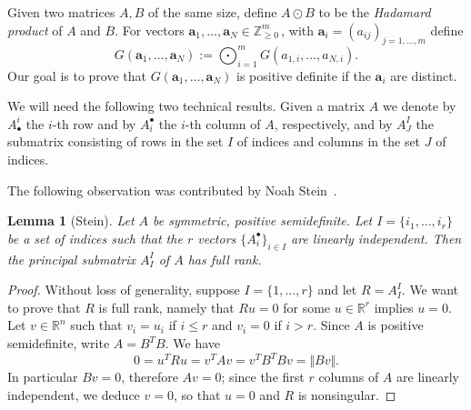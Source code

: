 \documentclass[11pt]{article}
\numberwithin{equation}{section}
\newtheorem{lemma}[theorem]{Lemma}
\theoremstyle{definition}
\theoremstyle{plain}
\newcommand{\vvirg}{ , \dots , }
\newcommand{\bfa}{\mathbf{a}}
\newcommand{\bbR}{\mathbb{R}}
\newcommand{\bbZ}{\mathbb{Z}}
\begin{document}
Given two matrices $A,B$ of the same size, define $A \odot B$ to be the \emph{Hadamard product} of $A$ and $B$. For vectors $\bfa_1 \vvirg \bfa_N \in \bbZ^{m}_{\geq 0}$\,, with $\bfa_i = (a_{ij}) _{j = 1 \vvirg m}$ define 
\[
 G(\bfa_1 \vvirg \bfa_N) := \bigodot_{i=1}^m G(a_{1,i}\vvirg a_{N,i}).
\]
Our goal is to prove that $G(\bfa_1 \vvirg \bfa_N)$ is positive definite if the  $\bfa_i$ are distinct.

%
We will need the following two technical results.  Given a matrix $A$ we
%
denote by $A^i_\bullet$ the $i$-th row   %
and by $A^\bullet_i$ the $i$-th column of $A$, respectively,  %
%
and by $A^I_J$ the submatrix consisting of rows in the set
%
%
$I$ of indices and columns in the set $J$ of indices.   %

%
The following observation was contributed by Noah Stein~\cite{266847}.
\begin{lemma}[Stein]\label{lemma: principal minor on indep rows}
 Let $A$ be symmetric, positive semidefinite. Let $I = \{ i_1 \vvirg i_r\}$ be a set of indices such that the $r$ vectors $\{ A^\bullet_i\}_{i \in I}$ are linearly independent. Then the principal submatrix $A^I_I$ of $A$ has full rank.
\end{lemma}
\begin{proof}
 Without loss of generality, suppose $I = \{ 1 \vvirg r\}$ and let $R = A^I_I$. We want to prove that $R$ is full rank, namely that $Ru = 0$ for some $u \in \bbR^r$ implies $u =0$. Let $v \in \bbR^n$ such that $v_i = u_i$ if $i\leq r$ and $v_i = 0$ if $i > r$. Since $A$ is positive semidefinite, write $A = B^T B$. We have 
 \[
0 =  u^T R u = v^T A v = v^T B^T B v = \Vert Bv \Vert.
 \]
In particular $Bv = 0$, therefore $Av =0$; since the first $r$ columns of $A$ are linearly independent, we deduce $v = 0$, so that $u =0$ and $R$ is nonsingular.
\end{proof}
\end{document}
